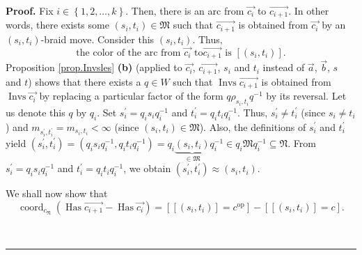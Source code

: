 \documentclass
[numbers=enddot,12pt,final,onecolumn,notitlepage,abstracton]{scrartcl}%
\theoremstyle{definition}
\newenvironment{proof}[1][Proof]{\noindent\textbf{#1.} }{\ \rule{0.5em}{0.5em}}
\begin{document}
\begin{proof}
Fix $i\in\left\{  1,2,\ldots,k\right\}  $. Then, there is an arc from
$\overrightarrow{c_{i}}$ to $\overrightarrow{c_{i+1}}$. In other words, there
exists some $\left(  s_{i},t_{i}\right)  \in\mathfrak{M}$ such that
$\overrightarrow{c_{i+1}}$ is obtained from $\overrightarrow{c_{i}}$ by an
$\left(  s_{i},t_{i}\right)  $-braid move. Consider this $\left(  s_{i}%
,t_{i}\right)  $. Thus,%
\begin{equation}
\text{the color of the arc from }\overrightarrow{c_{i}}\text{ to
}\overrightarrow{c_{i+1}}\text{ is }\left[  \left(  s_{i},t_{i}\right)
\right]  . \label{pf.thm.BCL.a.color}%
\end{equation}
Proposition \ref{prop.Invsles} \textbf{(b)} (applied to $\overrightarrow{c_{i}%
}$, $\overrightarrow{c_{i+1}}$, $s_{i}$ and $t_{i}$ instead of
$\overrightarrow{a}$, $\overrightarrow{b}$, $s$ and $t$) shows that there
exists a $q\in W$ such that $\operatorname*{Invs}\overrightarrow{c_{i+1}}$ is
obtained from $\operatorname*{Invs}\overrightarrow{c_{i}}$ by replacing a
particular factor of the form $q\rho_{s_{i},t_{i}}q^{-1}$ by its reversal. Let
us denote this $q$ by $q_{i}$. Set $s_{i}^{\prime}=q_{i}s_{i}q_{i}^{-1}$ and
$t_{i}^{\prime}=q_{i}t_{i}q_{i}^{-1}$. Thus, $s_{i}^{\prime}\neq t_{i}%
^{\prime}$ (since $s_{i}\neq t_{i}$) and $m_{s_{i}^{\prime},t_{i}^{\prime}%
}=m_{s_{i},t_{i}}<\infty$ (since $\left(  s_{i},t_{i}\right)  \in\mathfrak{M}%
$). Also, the definitions of $s_{i}^{\prime}$ and $t_{i}^{\prime}$ yield
$\left(  s_{i}^{\prime},t_{i}^{\prime}\right)  =\left(  q_{i}s_{i}q_{i}%
^{-1},q_{i}t_{i}q_{i}^{-1}\right)  =q_{i}\underbrace{\left(  s_{i}%
,t_{i}\right)  }_{\in\mathfrak{M}}q_{i}^{-1}\in q_{i}\mathfrak{M}q_{i}%
^{-1}\subseteq\mathfrak{N}$. From $s_{i}^{\prime}=q_{i}s_{i}q_{i}^{-1}$ and
$t_{i}^{\prime}=q_{i}t_{i}q_{i}^{-1}$, we obtain $\left(  s_{i}^{\prime}%
,t_{i}^{\prime}\right)  \approx\left(  s_{i},t_{i}\right)  $.

We shall now show that%
\begin{equation}
\operatorname*{coord}\nolimits_{c_{\mathfrak{N}}}\left(  \operatorname*{Has}%
\overrightarrow{c_{i+1}}-\operatorname*{Has}\overrightarrow{c_{i}}\right)
=\left[  \left[  \left(  s_{i},t_{i}\right)  \right]  =c^{\operatorname*{op}%
}\right]  -\left[  \left[  \left(  s_{i},t_{i}\right)  \right]  =c\right]  .
\label{pf.thm.BCL.a.hasdiff1}%
\end{equation}



\end{proof}
\end{document}
